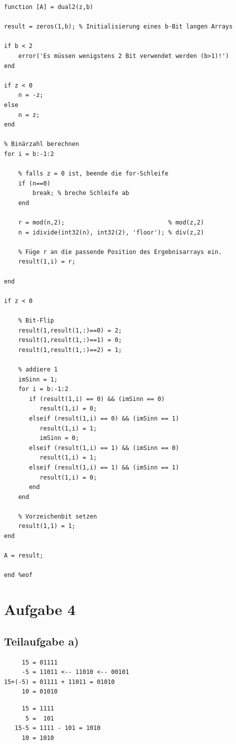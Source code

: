 \documentclass{llncs}
\begin{document}
\begin{verbatim}
function [A] = dual2(z,b)

result = zeros(1,b); % Initialisierung eines b-Bit langen Arrays

if b < 2
    error('Es müssen wenigstens 2 Bit verwendet werden (b>1)!')
end

if z < 0
    n = -z;
else
    n = z;
end

% Binärzahl berechnen
for i = b:-1:2

    % falls z = 0 ist, beende die for-Schleife
    if (n==0)
        break; % breche Schleife ab
    end
    
    r = mod(n,2);                             % mod(z,2)
    n = idivide(int32(n), int32(2), 'floor'); % div(z,2)
    
    % Füge r an die passende Position des Ergebnisarrays ein.
    result(1,i) = r; 
 
end

if z < 0

    % Bit-Flip
    result(1,result(1,:)==0) = 2;
    result(1,result(1,:)==1) = 0;
    result(1,result(1,:)==2) = 1;

    % addiere 1
    imSinn = 1;
    for i = b:-1:2
       if (result(1,i) == 0) && (imSinn == 0)
          result(1,i) = 0;
       elseif (result(1,i) == 0) && (imSinn == 1)
          result(1,i) = 1;
          imSinn = 0;
       elseif (result(1,i) == 1) && (imSinn == 0)
          result(1,i) = 1;
       elseif (result(1,i) == 1) && (imSinn == 1)
          result(1,i) = 0;
       end
    end
    
    % Vorzeichenbit setzen
    result(1,1) = 1;
end

A = result;

end %eof
\end{verbatim}

\section*{Aufgabe 4}

\subsection*{Teilaufgabe a)}

\begin{verbatim}
     15 = 01111
     -5 = 11011 <-- 11010 <-- 00101
15+(-5) = 01111 + 11011 = 01010
     10 = 01010
\end{verbatim}

\begin{verbatim}
     15 = 1111
      5 =  101
   15-5 = 1111 - 101 = 1010
     10 = 1010
\end{verbatim}
\end{document}
